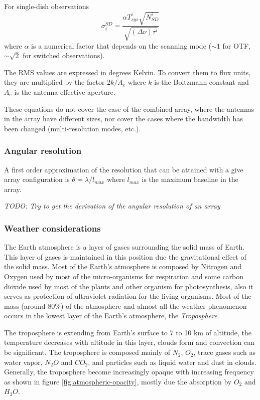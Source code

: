 \documentclass[11pt]{article}
\begin{document}
For single-dish observations
\begin{equation}
\sigma_i^{SD} = \frac{\alpha T_{sys}^i \sqrt{N_{SD}^i}}{\sqrt{(\Delta\nu)\tau^i}}
\end{equation}
where $\alpha$ is a numerical factor that depends on the scanning mode ($\sim 1$ for OTF,
$\sim \sqrt{2}$ for switched observations).

The RMS values are expressed in degrees Kelvin. To convert them to flux units, they are multiplied by the factor $2k/A_e$ where $k$ is the Boltzmann constant and $A_e$ is the antenna effective aperture.

These equations do not cover the case of the combined array, where the antennas in the array have different sizes, nor cover the cases where the bandwidth has been changed (multi-resolution modes, etc.).

\subsubsection{Angular resolution}
\label{sec:angular-res}
A first order approximation of the resolution that can be attained with a give
array configuration is $\theta = \lambda / l_{max}$ where $l_{max}$ is the maximum
baseline in the array.

\textit{TODO: Try to get the derivation of the angular resolution of an array}

\subsubsection{Weather considerations}

The Earth atmosphere is a layer of gases surrounding the solid mass of Earth. This layer of gases is maintained in this position due the gravitational effect of the solid mass. Most of the Earth's atmosphere is composed by Nitrogen and Oxygen used by most of the micro-organisms for respiration and some carbon dioxide used by most of the plants and other organism for photosynthesis,	also it serves as protection of ultraviolet radiation for the living organisms. Most of the mass (around $80\%$) of the atmosphere and almost all the weather phenomenon occurs in the lowest layer of the Earth's atmosphere, the \textit{Troposphere}.

The troposphere is extending from Earth's surface to 7 to 10 km of altitude, the temperature decreases with altitude in this layer, clouds form and convection can be significant. The troposphere is composed mainly of $N_2$, $O_2$, trace gases such as water vapor, $N_2O$ and $CO_2$, and particles such as liquid water and dust in clouds. Generally, the troposphere become increasingly opaque with increasing frequency as shown in figure \ref{fig:atmospheric-opacity}, mostly due the absorption by $O_2$ and $H_2O$.
\end{document}
